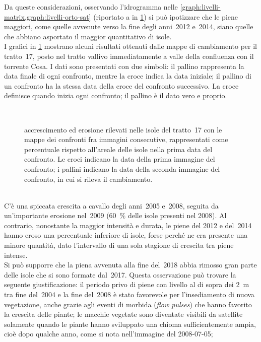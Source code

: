 Da queste considerazioni, osservando l'idrogramma nelle \cref{graph:livelli-matrix,graph:livelli-orto-sat} (riportato a  in \cref{graph:tr-17-camb}) si può ipotizzare che le piene maggiori, come quelle avvenute verso la fine degli anni~2012 e~2014, siano quelle che abbiano asportato il maggior quantitativo di isole.
\\
I grafici in \cref{graph:tr-17-camb} mostrano alcuni risultati ottenuti dalle mappe di cambiamento per il tratto~17, posto nel tratto vallivo immediatamente a valle della confluenza con il torrente Cosa.
I dati sono presentati con due simboli: il pallino rappresenta la data finale di ogni confronto, mentre la croce indica la data iniziale; il pallino di un confronto ha la stessa data della croce del confronto successivo. 
La croce definisce quando inizia ogni confronto; il pallino è il dato vero e proprio.
%
\begin{figure}
	\centering
	
	\\
	
	\caption[cambiamenti rilevati nelle isole nel tratto~17]{accrescimento ed erosione rilevati nelle isole del tratto~17 con le mappe dei confronti fra immagini consecutive, rappresentati come percentuale rispetto all'areale delle isole nella prima data del confronto.
	Le croci indicano la data della prima immagine del confronto; i pallini indicano la data della seconda immagine del confronto, in cui si rileva il cambiamento.}
	\label{graph:tr-17-camb}
\end{figure}
%
\\
C'è una spiccata crescita a cavallo degli anni~2005 e~2008, seguita da un'importante erosione nel~2009 (\SI{60}{\percent} delle isole presenti nel 2008).
Al contrario, nonostante la maggior intensità e durata, le piene del 2012 e del~2014 hanno eroso una percentuale inferiore di isole, forse perché ne era presente una minore quantità, dato l'intervallo di una sola stagione di crescita tra piene intense.
\\
Si può supporre che la piena avvenuta alla fine del~2018 abbia rimosso gran parte delle isole che si sono formate dal~2017.
Questa osservazione può trovare la seguente giustificazione: il periodo privo di piene con livello al di sopra dei \SI{2}{\m} tra fine del~2004 e la fine del~2008 è stato favorevole per l'insediamento di nuova vegetazione, anche grazie agli eventi di morbida (\emph{flow pulses}) che hanno favorito la crescita delle piante;
le macchie vegetate sono diventate visibili da satellite solamente quando le piante hanno sviluppato una chioma sufficientemente ampia, cioè dopo qualche anno, come si nota nell'immagine del 2008-07-05;
